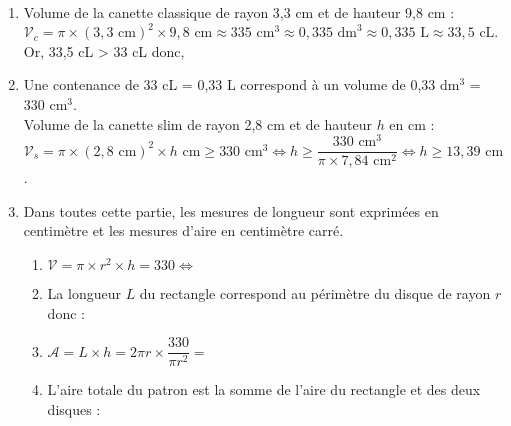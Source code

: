 \ \\ [-5mm]
\begin{enumerate}
   \item Volume de la canette classique de rayon 3,3 cm et de hauteur 9,8 cm : \\
   $\mathcal{V}_c =\pi\times(3,3\text{ cm})^2\times9,8\text{ cm} \approx 335\text{ cm}^3 \approx0,335\text{ dm}^3 \approx0,335\text{ L} \approx33,5\text{ cL}$. \\
   Or, 33,5 cL > 33 cL donc, 
   \item Une contenance de 33 cL = 0,33 L correspond à un volume de 0,33 dm$^3$ = 330 cm$^3$. \\
   Volume de la canette slim de rayon 2,8 cm et de hauteur $h$ en cm : \\
   $\mathcal{V}_s =\pi\times(2,8\text{ cm})^2\times h\text{ cm} \geq 330\text{ cm}^3 \iff h \geq \dfrac{330\text{ cm}^3}{\pi\times7,84\text{ cm}^2} \iff h \geq 13,39\text{ cm}$. \\ [1mm]
   \item Dans toutes cette partie, les mesures de longueur sont exprimées en centimètre et les mesures d'aire en centimètre carré. \\
   \begin{enumerate}
      \item $\mathcal{V} =\pi\times r^2\times h =330 \iff$ 
      \item La longueur $L$ du rectangle correspond au périmètre du disque de rayon $r$ donc : 
      \item $\mathcal{A} =L\times h =2\pi r\times\dfrac{330}{\pi r^2} =$ 
      \item L'aire totale du patron est la somme de l'aire du rectangle et des deux disques : 
   \end{enumerate}
\end{enumerate}
